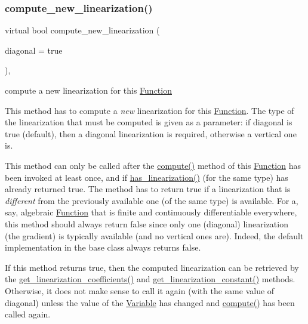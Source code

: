 \subsubsection{\texorpdfstring{compute\+\_\+new\+\_\+linearization()}{compute\_new\_linearization()}}
{\footnotesize\ttfamily virtual bool compute\+\_\+new\+\_\+linearization (\begin{DoxyParamCaption}\item[{const bool}]{diagonal = {\ttfamily true} }\end{DoxyParamCaption})\hspace{0.3cm}{\ttfamily [inline]}, {\ttfamily [virtual]}}



compute a new linearization for this \mbox{\hyperlink{class_s_m_spp__di__unipi__it_1_1_function}{Function}} 

This method has to compute a {\itshape new} linearization for this \mbox{\hyperlink{class_s_m_spp__di__unipi__it_1_1_function}{Function}}. The type of the linearization that must be computed is given as a parameter\+: if diagonal is true (default), then a diagonal linearization is required, otherwise a vertical one is.

This method can only be called after the \mbox{\hyperlink{class_s_m_spp__di__unipi__it_1_1_function_a504d4e3e174c7a518cc66156a8a45ce5}{compute()}} method of this \mbox{\hyperlink{class_s_m_spp__di__unipi__it_1_1_function}{Function}} has been invoked at least once, and if \mbox{\hyperlink{class_s_m_spp__di__unipi__it_1_1_c05_function_a5f49301b93b1980e945001a23d3ce2a9}{has\+\_\+linearization()}} (for the same type) has already returned true. The method has to return true if a linearization that is {\itshape different} from the previously available one (of the same type) is available. For a, say, algebraic \mbox{\hyperlink{class_s_m_spp__di__unipi__it_1_1_function}{Function}} that is finite and continuously differentiable everywhere, this method should always return false since only one (diagonal) linearization (the gradient) is typically available (and no vertical ones are). Indeed, the default implementation in the base class always returns false.

If this method returns true, then the computed linearization can be retrieved by the \mbox{\hyperlink{class_s_m_spp__di__unipi__it_1_1_c05_function_a6fa70047dc8b3d43a3ed44f1859a7239}{get\+\_\+linearization\+\_\+coefficients()}} and \mbox{\hyperlink{class_s_m_spp__di__unipi__it_1_1_c05_function_a3dd9dea6fa3125e0c45acb5fc28955f8}{get\+\_\+linearization\+\_\+constant()}} methods. Otherwise, it does not make sense to call it again (with the same value of diagonal) unless the value of the \mbox{\hyperlink{class_s_m_spp__di__unipi__it_1_1_variable}{Variable}} has changed and \mbox{\hyperlink{class_s_m_spp__di__unipi__it_1_1_function_a504d4e3e174c7a518cc66156a8a45ce5}{compute()}} has been called again.

